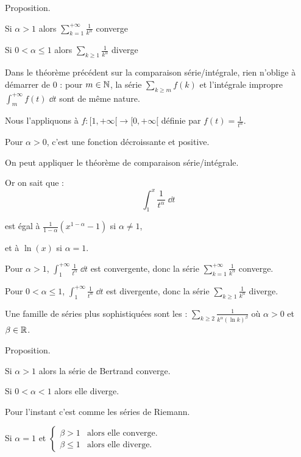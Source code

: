 \change
Proposition.

\change

Si $\alpha >1$ alors $\displaystyle  \sum_{k = 1}^{+\infty} \frac{1}{k^\alpha}$ converge

\change
Si $0 <\alpha \le1$ alors $\displaystyle  \sum_{k \ge 1} \frac{1}{k^\alpha}$ diverge


\diapo

\change
Dans le théorème précédent sur la comparaison série/intégrale, rien n'oblige à démarrer de $0$ : pour $m\in\mathbb{N}$,
la série $\sum_{k \ge m} f(k)$ et l'intégrale impropre $\int_m^{+\infty} f(t) \;\dd t$ sont de même nature.

\change
Nous l'appliquons à $f : [1,+\infty[ \to [0,+\infty[$ définie par $f(t)=\frac{1}{t^\alpha}$. 

\change
Pour $\alpha >0$, c'est une fonction décroissante et positive.

\change
On peut appliquer le théorème de comparaison série/intégrale.

\change
Or on sait que :
$$
\int_1^{x} \frac{1}{t^\alpha}\;\dd t$$

est égal à $ \displaystyle{\frac{1}{1-\alpha}(x^{1-\alpha}-1)}$ si $\alpha\neq 1$,

\change
et à $\ln(x)$ si $\alpha=1$.

\change
Pour $\alpha > 1$, $\int_1^{+\infty} \frac{1}{t^\alpha} \; \dd t $ 
est convergente, donc la série $\sum_{k = 1}^{+\infty} \frac{1}{k^\alpha}$ converge.

\change
Pour $0<\alpha\le 1$, $\int_1^{+\infty} \frac{1}{t^\alpha} \; \dd t $ 
est divergente, donc la série $\sum_{k \ge 1} \frac{1}{k^\alpha}$ diverge.


\diapo

Une famille de séries plus sophistiquées sont les  : 
$\displaystyle\sum_{k\ge2} \frac{1}{k^\alpha(\ln k)^\beta}$
où $\alpha > 0$ et $\beta \in \mathbb{R}$.

\change
Proposition.

Si \quad $\alpha>1$ \quad  alors la série de Bertrand converge. 

Si \quad $0<\alpha<1$ \quad  alors elle diverge.

Pour l'instant c'est comme les séries de Riemann.

\change
Si \quad $\alpha=1$ \quad et \quad $\begin{cases} \beta>1 & \text{alors elle converge.}\\   
\beta\le 1 & \text{alors elle diverge.}
\end{cases}$


